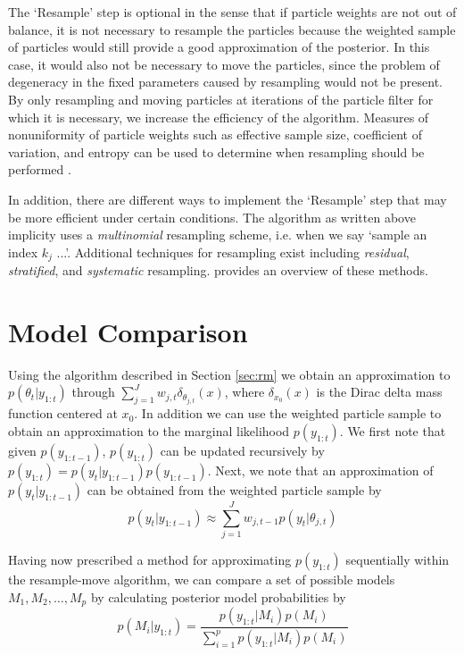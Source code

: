 \documentclass{article}
\begin{document}
The `Resample' step is optional in the sense that if particle weights are not out of balance, it is not necessary to resample the particles because the weighted sample of particles would still provide a good approximation of the posterior. In this case, it would also not be necessary to move the particles, since the problem of degeneracy in the fixed parameters caused by resampling would not be present. By only resampling and moving particles at iterations of the particle filter for which it is necessary, we increase the efficiency of the algorithm. Measures of nonuniformity of particle weights such as effective sample size, coefficient of variation, and entropy can be used to determine when resampling should be performed \citep{Liu:Chen:Wong:reje:1998}. %

In addition, there are different ways to implement the `Resample' step that may be more efficient under certain conditions. The algorithm as written above implicity uses a \emph{multinomial} resampling scheme, i.e. when we say `sample an index $k_j$ ...'. Additional techniques for resampling exist including \emph{residual}, \emph{stratified}, and \emph{systematic} resampling. \citet{Douc:Capp:Moul:comp:2005} provides an overview of these methods. %

\section{Model Comparison}

Using the algorithm described in Section \ref{sec:rm} we obtain an approximation to $p(\theta_t|y_{1:t})$ through $\sum_{j=1}^J w_{j,t}\delta_{\theta_{j,t}}(x)$, where $\delta_{x_0}(x)$ is the Dirac delta mass function centered at $x_0$. In addition we can use the weighted particle sample to obtain an approximation to the marginal likelihood $p(y_{1:t})$. We first note that given $p(y_{1:t-1})$, $p(y_{1:t})$ can be updated recursively by $p(y_{1:t}) = p(y_t|y_{1:t-1})p(y_{1:t-1})$. Next, we note that an approximation of $p(y_t|y_{1:t-1})$ can be obtained from the weighted particle sample by
\begin{equation}
p(y_t|y_{1:t-1}) \approx \sum_{j=1}^J w_{j,t-1}p(y_t|\theta_{j,t}) \label{eqn:condmarg}
\end{equation}

Having now prescribed a method for approximating $p(y_{1:t})$ sequentially within the resample-move algorithm, we can compare a set of possible models ${M_1,M_2,\ldots,M_p}$ by calculating posterior model probabilities by
\begin{equation}
p(M_i|y_{1:t}) = \frac{p(y_{1:t}|M_i)p(M_i)}{\sum_{i=1}^p p(y_{1:t}|M_i)p(M_i)} \label{eqn:modelcomp}
\end{equation}
\end{document}

